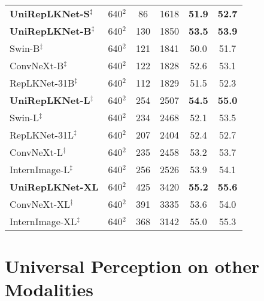 \documentclass[10pt,twocolumn,letterpaper]{article}
\begin{document}
\begin{table}[t]
\begin{tabular}{l|c|c|c|cc}
        \hline
        \rowcolor{gray!20}
        \textbf{UniRepLKNet-S}$^\ddagger$    &   640$^2$    &  86 & 1618  &   \textbf{51.9}  &   \textbf{52.7}\\      
        \rowcolor{gray!20}
        \textbf{UniRepLKNet-B}$^\ddagger$    &   640$^2$    &  130  & 1850 &   \textbf{53.5}    &   \textbf{53.9}\\
        Swin-B$^\ddagger$~\cite{liu2021swin}    &   640$^2$ &   121 &   1841   & 50.0   &   51.7\\
        ConvNeXt-B$^\ddagger$~\cite{liu2022convnet}      &   640$^2$     &   122     &   1828    &    52.6   &   53.1\\
        RepLKNet-31B$^\ddagger$~\cite{ding2022scaling}   &   640$^2$       &   112 &   1829    &   51.5    &   52.3 \\ 
        \hline
        \rowcolor{gray!20}
        \textbf{UniRepLKNet-L}$^\ddagger$    &   640$^2$    &   254  &   2507   &   \textbf{54.5}    &   \textbf{55.0}   \\
        Swin-L$^\ddagger$~\cite{liu2021swin} 
        & 640$^2$ & 234 & 2468 & 52.1 & 53.5 \\
        RepLKNet-31L$^\ddagger$~\cite{ding2022scaling} 
        & 640$^2$ & 207 & 2404 & 52.4 & 52.7 \\
        ConvNeXt-L$^\ddagger$~\cite{liu2022convnet} 
        & 640$^2$ & 235 & 2458 & 53.2 & 53.7 \\
        
        
        InternImage-L$^\ddagger$~\cite{wang2023internimage}
        & 640$^2$ & 256  & 2526  & 53.9 & 54.1 \\
        \hline
        \rowcolor{gray!20}
        \textbf{UniRepLKNet-XL}    &   640$^2$    &   425  &   3420   &   \textbf{55.2}    &   \textbf{55.6}   \\
        ConvNeXt-XL$^\ddagger$~\cite{liu2022convnet}
        & 640$^2$ & 391 & 3335 & 53.6 & 54.0 \\
        InternImage-XL$^\ddagger$~\cite{wang2023internimage}
        & 640$^2$ & 368 & 3142 & 55.0 & 55.3 \\
        
        
        \hline
               
    \end{tabular}
    \label{tab:seg}
    \vspace{-0.2in}
\end{table}  

\section{Universal Perception on other Modalities}
\end{document}
